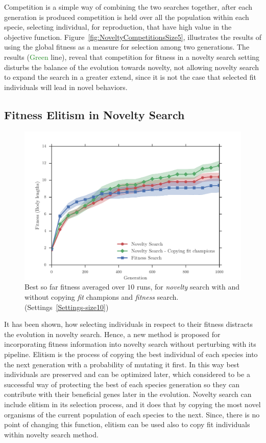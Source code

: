 Competition is a simple way of combining the two searches together, after each generation is produced competition is held over all the population within each specie, selecting individual, for reproduction, that have high value in the objective function. Figure~\ref{fig:NoveltyCompetitionsSize5}, illustrates the results of using the global fitness as a measure for selection among two generations. The results (\textcolor{ForestGreen}{Green} line), reveal that competition for fitness in a novelty search setting disturbs the balance of the evolution towards novelty, not allowing novelty search to expand the search in a greater extend, since it is not the case that selected fit individuals will lead in novel behaviors. 






\subsection*{Fitness Elitism in Novelty Search}

\begin{figure}[t!]
\centering
\includegraphics[width=1.0\textwidth]{../Figures/Results/CopyFitChampions10.pdf}
\caption{Best so far fitness averaged over $10$ runs, for \emph{novelty} search with and without copying \emph{fit} champions and \emph{fitness} search. (Settings~\ref{Settings-size10})}
\label{fig:CopyFitChampions10}
\end{figure}

It has been shown, how selecting individuals in respect to their fitness distracts the evolution in novelty search. Hence, a new method is proposed for incorporating fitness information into novelty search without perturbing with its pipeline. Elitism is the process of copying the best individual of each species into the next generation with a probability of mutating it first. In this way best individuals are preserved and can be optimized later, which considered to be a successful way of protecting the best of each species generation so they can contribute with their beneficial genes later in the evolution. Novelty search can include elitism in its selection process, and it does that by copying the most novel organisms of the current population of each species to the next. Since, there is no point of changing this function, elitism can be used also to copy fit individuals within novelty search method. 

